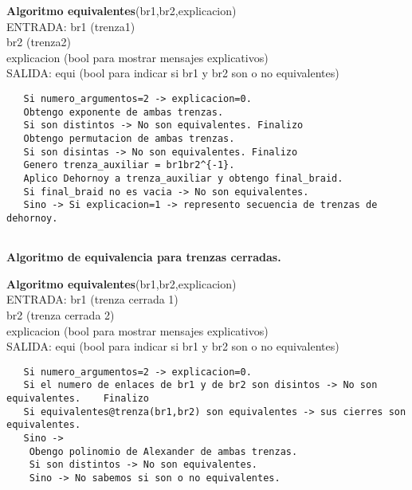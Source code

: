 \begin{alg}
	\textbf{Algoritmo equivalentes}(br1,br2,explicacion)\\
	ENTRADA: br1 (trenza1)\\
	\hspace*{2.2cm} br2 (trenza2)\\
	\hspace*{2.2cm} explicacion (bool para mostrar mensajes explicativos)\\
	SALIDA: \hspace{0.4cm} equi (bool para indicar si br1 y br2 son o no equivalentes)
	
\begin{lstlisting}
   Si numero_argumentos=2 -> explicacion=0.
   Obtengo exponente de ambas trenzas.
   Si son distintos -> No son equivalentes. Finalizo
   Obtengo permutacion de ambas trenzas.
   Si son disintas -> No son equivalentes. Finalizo
   Genero trenza_auxiliar = br1br2^{-1}.
   Aplico Dehornoy a trenza_auxiliar y obtengo final_braid.
   Si final_braid no es vacia -> No son equivalentes. 
   Sino -> Si explicacion=1 -> represento secuencia de trenzas de dehornoy.
    
\end{lstlisting}
\end{alg}

\bigskip
\begin{center}
	\textbf{Algoritmo de equivalencia para trenzas cerradas.}
\end{center} 

\begin{alg}
	\textbf{Algoritmo equivalentes}(br1,br2,explicacion)\\
	ENTRADA: br1 (trenza cerrada 1)\\
	\hspace*{2.2cm} br2 (trenza cerrada 2)\\
	\hspace*{2.2cm} explicacion (bool para mostrar mensajes explicativos)\\
	SALIDA: \hspace{0.4cm} equi (bool para indicar si br1 y br2 son o no equivalentes)
	
\begin{lstlisting}
   Si numero_argumentos=2 -> explicacion=0.
   Si el numero de enlaces de br1 y de br2 son disintos -> No son equivalentes.    Finalizo
   Si equivalentes@trenza(br1,br2) son equivalentes -> sus cierres son equivalentes.
   Sino ->   
   	Obengo polinomio de Alexander de ambas trenzas.
	Si son distintos -> No son equivalentes.
	Sino -> No sabemos si son o no equivalentes. 
\end{lstlisting}
\end{alg}

